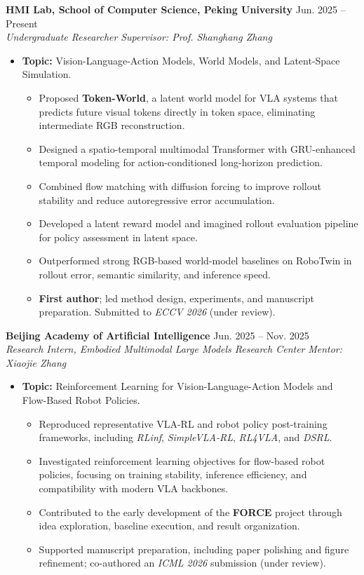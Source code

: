 \documentclass[10pt,a4paper]{article}
\newcommand{\entry}[4]{%
  \textbf{#1} \hfill #2\\
  \textit{#3} \hfill \textit{#4}\\[-0.35em]
}
\newcommand{\cvitem}[1]{\item \small #1}
\begin{document}
\entry{HMI Lab, School of Computer Science, Peking University}{Jun. 2025 -- Present}{Undergraduate Researcher}{Supervisor: Prof. Shanghang Zhang}
\begin{itemize}[leftmargin=1.2em, topsep=0.2em, itemsep=0.18em]
  \cvitem{\textbf{Topic:} Vision-Language-Action Models, World Models, and Latent-Space Simulation.}
  \begin{itemize}[leftmargin=1.4em, topsep=0.15em, itemsep=0.12em]
    \item Proposed \textbf{Token-World}, a latent world model for VLA systems that predicts future visual tokens directly in token space, eliminating intermediate RGB reconstruction.
    \item Designed a spatio-temporal multimodal Transformer with GRU-enhanced temporal modeling for action-conditioned long-horizon prediction.
    \item Combined flow matching with diffusion forcing to improve rollout stability and reduce autoregressive error accumulation.
    \item Developed a latent reward model and imagined rollout evaluation pipeline for policy assessment in latent space.
    \item Outperformed strong RGB-based world-model baselines on RoboTwin in rollout error, semantic similarity, and inference speed.
    \item \textbf{First author}; led method design, experiments, and manuscript preparation. Submitted to \textit{ECCV 2026} (under review).
  \end{itemize}
\end{itemize}

\entry{Beijing Academy of Artificial Intelligence}{Jun. 2025 -- Nov. 2025}{Research Intern, Embodied Multimodal Large Models Research Center}{Mentor: Xiaojie Zhang}
\begin{itemize}[leftmargin=1.2em, topsep=0.2em, itemsep=0.18em]
  \cvitem{\textbf{Topic:} Reinforcement Learning for Vision-Language-Action Models and Flow-Based Robot Policies.}
  \begin{itemize}[leftmargin=1.4em, topsep=0.15em, itemsep=0.12em]
    \item Reproduced representative VLA-RL and robot policy post-training frameworks, including \textit{RLinf}, \textit{SimpleVLA-RL}, \textit{RL4VLA}, and \textit{DSRL}.
    \item Investigated reinforcement learning objectives for flow-based robot policies, focusing on training stability, inference efficiency, and compatibility with modern VLA backbones.
    \item Contributed to the early development of the \textbf{FORCE} project through idea exploration, baseline execution, and result organization.
    \item Supported manuscript preparation, including paper polishing and figure refinement; co-authored an \textit{ICML 2026} submission (under review).
  \end{itemize}
\end{itemize}
\end{document}
